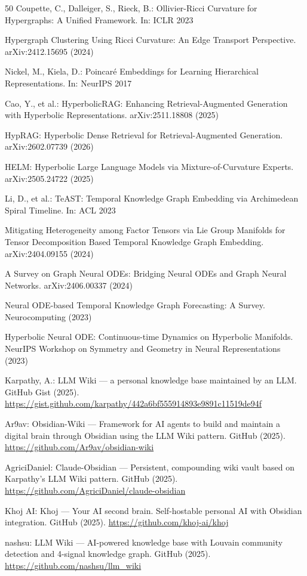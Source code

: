\documentclass[hf]{ceurart}
\begin{document}
\begin{thebibliography}{50}
Coupette, C., Dalleiger, S., Rieck, B.: Ollivier-Ricci Curvature
for Hypergraphs: A Unified Framework. In: ICLR 2023

Hypergraph Clustering Using Ricci Curvature: An Edge Transport
Perspective. arXiv:2412.15695 (2024)

Nickel, M., Kiela, D.: Poincar\'{e} Embeddings for Learning
Hierarchical Representations. In: NeurIPS 2017

Cao, Y., et al.: HyperbolicRAG: Enhancing Retrieval-Augmented
Generation with Hyperbolic Representations. arXiv:2511.18808 (2025)

HypRAG: Hyperbolic Dense Retrieval for Retrieval-Augmented
Generation. arXiv:2602.07739 (2026)

HELM: Hyperbolic Large Language Models via Mixture-of-Curvature
Experts. arXiv:2505.24722 (2025)

Li, D., et al.: TeAST: Temporal Knowledge Graph Embedding via
Archimedean Spiral Timeline. In: ACL 2023

Mitigating Heterogeneity among Factor Tensors via Lie Group
Manifolds for Tensor Decomposition Based Temporal Knowledge Graph
Embedding. arXiv:2404.09155 (2024)

A Survey on Graph Neural ODEs: Bridging Neural ODEs and Graph Neural
Networks. arXiv:2406.00337 (2024)

Neural ODE-based Temporal Knowledge Graph Forecasting: A Survey.
Neurocomputing (2023)

Hyperbolic Neural ODE: Continuous-time Dynamics on Hyperbolic Manifolds.
NeurIPS Workshop on Symmetry and Geometry in Neural Representations
(2023)

Karpathy, A.: LLM Wiki --- a personal knowledge base maintained by
an LLM. GitHub Gist (2025).
\url{https://gist.github.com/karpathy/442a6bf555914893e9891c11519de94f}

Ar9av: Obsidian-Wiki --- Framework for AI agents to build and maintain
a digital brain through Obsidian using the LLM Wiki pattern. GitHub
(2025). \url{https://github.com/Ar9av/obsidian-wiki}

AgriciDaniel: Claude-Obsidian --- Persistent, compounding wiki vault
based on Karpathy's LLM Wiki pattern. GitHub (2025).
\url{https://github.com/AgriciDaniel/claude-obsidian}

Khoj AI: Khoj --- Your AI second brain. Self-hostable personal AI
with Obsidian integration. GitHub (2025).
\url{https://github.com/khoj-ai/khoj}

nashsu: LLM Wiki --- AI-powered knowledge base with Louvain community
detection and 4-signal knowledge graph. GitHub (2025).
\url{https://github.com/nashsu/llm_wiki}

\end{thebibliography}
\end{document}
